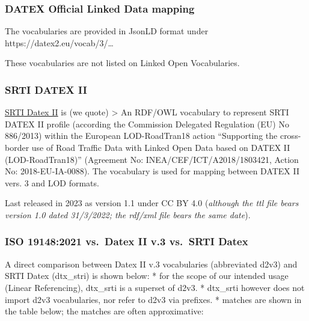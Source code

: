 \documentclass[
  11pt,
]{article}
\begin{document}
\hypertarget{datex-official-linked-data-mapping}{%
\subsubsection{DATEX Official Linked Data
mapping}\label{datex-official-linked-data-mapping}}

The vocabularies are provided in JsonLD format under
https://datex2.eu/vocab/3/\ldots{}

These vocabularies are not listed on Linked Open Vocabularies.

\hypertarget{srti-datex-ii}{%
\subsubsection{SRTI DATEX II}\label{srti-datex-ii}}

\href{https://cef.uv.es/lodroadtran18/def/transporte/dtx_srti/\#hasLinearElement}{SRTI
Datex II} is (we quote) \textgreater{} An RDF/OWL vocabulary to
represent SRTI DATEX II profile (according the Commission Delegated
Regulation (EU) No 886/2013) within the European LOD-RoadTran18 action
``Supporting the cross-border use of Road Traffic Data with Linked Open
Data based on DATEX II (LOD-RoadTran18)'' (Agreement No:
INEA/CEF/ICT/A2018/1803421, Action No: 2018-EU-IA-0088). The vocabulary
is used for mapping between DATEX II vers. 3 and LOD formats.

Last released in 2023 as version 1.1 under CC BY 4.0 (\emph{although the
ttl file bears version 1.0 dated 31/3/2022; the rdf/xml file bears the
same date}).

\hypertarget{iso-191482021-vs.-datex-ii-v.3-vs.-srti-datex}{%
\subsubsection{ISO 19148:2021 vs.~Datex II v.3 vs.~SRTI
Datex}\label{iso-191482021-vs.-datex-ii-v.3-vs.-srti-datex}}

A direct comparison between Datex II v.3 vocabularies (abbreviated d2v3)
and SRTI Datex (dtx\_stri) is shown below: * for the scope of our
intended usage (Linear Referencing), dtx\_srti is a superset of d2v3. *
dtx\_srti however does not import d2v3 vocabularies, nor refer to d2v3
via prefixes. * matches are shown in the table below; the matches are
often approximative:
\end{document}
